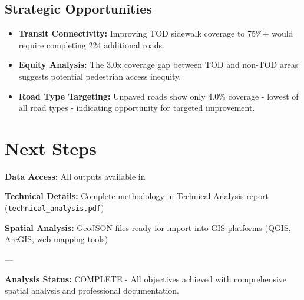 \documentclass[11pt,letterpaper]{article}
\begin{document}
\subsection{Strategic Opportunities}
\begin{itemize}
    \item \textbf{Transit Connectivity:} Improving TOD sidewalk coverage to 75\%+ would require completing 224 additional roads.
    \item \textbf{Equity Analysis:} The 3.0x coverage gap between TOD and non-TOD areas suggests potential pedestrian access inequity.
    \item \textbf{Road Type Targeting:} Unpaved roads show only 4.0\% coverage - lowest of all road types - indicating opportunity for targeted improvement.
\end{itemize}

\section{Next Steps}

\textbf{Data Access:} All outputs available in \texttt{}

\textbf{Technical Details:} Complete methodology in Technical Analysis report (\texttt{technical\_analysis.pdf})

\textbf{Spatial Analysis:} GeoJSON files ready for import into GIS platforms (QGIS, ArcGIS, web mapping tools)

---

\textbf{Analysis Status:} COMPLETE - All objectives achieved with comprehensive spatial analysis and professional documentation.
\end{document}
